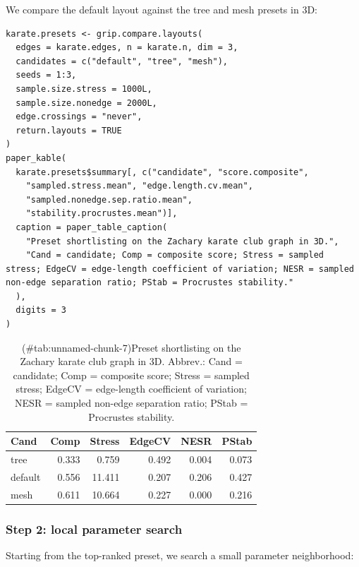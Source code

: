 We compare the default layout against the tree and mesh presets in 3D:

\begin{verbatim}
karate.presets <- grip.compare.layouts(
  edges = karate.edges, n = karate.n, dim = 3,
  candidates = c("default", "tree", "mesh"),
  seeds = 1:3,
  sample.size.stress = 1000L,
  sample.size.nonedge = 2000L,
  edge.crossings = "never",
  return.layouts = TRUE
)
paper_kable(
  karate.presets$summary[, c("candidate", "score.composite",
    "sampled.stress.mean", "edge.length.cv.mean",
    "sampled.nonedge.sep.ratio.mean",
    "stability.procrustes.mean")],
  caption = paper_table_caption(
    "Preset shortlisting on the Zachary karate club graph in 3D.",
    "Cand = candidate; Comp = composite score; Stress = sampled stress; EdgeCV = edge-length coefficient of variation; NESR = sampled non-edge separation ratio; PStab = Procrustes stability."
  ),
  digits = 3
)
\end{verbatim}

\begin{table}

\caption{(\#tab:unnamed-chunk-7)Preset shortlisting on the Zachary karate club graph in 3D. Abbrev.: Cand = candidate; Comp = composite score; Stress = sampled stress; EdgeCV = edge-length coefficient of variation; NESR = sampled non-edge separation ratio; PStab = Procrustes stability.}
\centering
\begin{tabular}[t]{l|r|r|r|r|r}
\hline
Cand & Comp & Stress & EdgeCV & NESR & PStab\\
\hline
tree & 0.333 & 0.759 & 0.492 & 0.004 & 0.073\\
\hline
default & 0.556 & 11.411 & 0.207 & 0.206 & 0.427\\
\hline
mesh & 0.611 & 10.664 & 0.227 & 0.000 & 0.216\\
\hline
\end{tabular}
\end{table}

\subsubsection{Step 2: local parameter search}\label{step-2-local-parameter-search}

Starting from the top-ranked preset, we search a small parameter neighborhood:

